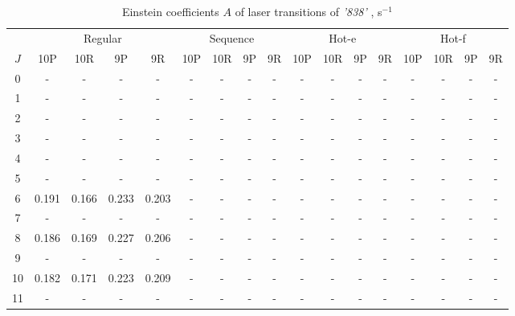 \documentclass{report}
\begin{document}
\begin{appendices}
\begin{table}
\centering
\caption{Einstein coefficients $A$ of laser transitions of \textit{'838'} , s$^{-1}$}
\label{table:A838}
\scriptsize
\begin{tabular}{|c|cccc|cccc|cccc|cccc|}
\hline
& \multicolumn{4}{c|}{Regular}& \multicolumn{4}{c|}{Sequence}& \multicolumn{4}{c|}{Hot-e}& \multicolumn{4}{c|}{Hot-f}\\
$J$ & 10P & 10R & 9P & 9R & 10P & 10R & 9P & 9R & 10P & 10R & 9P & 9R & 10P & 10R & 9P & 9R\\ 
\hline
0  &   -   &   -   &   -   &   -   &   -   &   -   &   -   &   -   &   -   &   -   &   -   &   -   &   -   &   -   &   -   &   -   \\
1  &   -   &   -   &   -   &   -   &   -   &   -   &   -   &   -   &   -   &   -   &   -   &   -   &   -   &   -   &   -   &   -   \\
2  &   -   &   -   &   -   &   -   &   -   &   -   &   -   &   -   &   -   &   -   &   -   &   -   &   -   &   -   &   -   &   -   \\
3  &   -   &   -   &   -   &   -   &   -   &   -   &   -   &   -   &   -   &   -   &   -   &   -   &   -   &   -   &   -   &   -   \\
4  &   -   &   -   &   -   &   -   &   -   &   -   &   -   &   -   &   -   &   -   &   -   &   -   &   -   &   -   &   -   &   -   \\
5  &   -   &   -   &   -   &   -   &   -   &   -   &   -   &   -   &   -   &   -   &   -   &   -   &   -   &   -   &   -   &   -   \\
6  & 0.191 & 0.166 & 0.233 & 0.203 &   -   &   -   &   -   &   -   &   -   &   -   &   -   &   -   &   -   &   -   &   -   &   -   \\
7  &   -   &   -   &   -   &   -   &   -   &   -   &   -   &   -   &   -   &   -   &   -   &   -   &   -   &   -   &   -   &   -   \\
8  & 0.186 & 0.169 & 0.227 & 0.206 &   -   &   -   &   -   &   -   &   -   &   -   &   -   &   -   &   -   &   -   &   -   &   -   \\
9  &   -   &   -   &   -   &   -   &   -   &   -   &   -   &   -   &   -   &   -   &   -   &   -   &   -   &   -   &   -   &   -   \\
10 & 0.182 & 0.171 & 0.223 & 0.209 &   -   &   -   &   -   &   -   &   -   &   -   &   -   &   -   &   -   &   -   &   -   &   -   \\
11 &   -   &   -   &   -   &   -   &   -   &   -   &   -   &   -   &   -   &   -   &   -   &   -   &   -   &   -   &   -   &   -   \\

\end{tabular}
\end{table}
\end{appendices}
\end{document}
